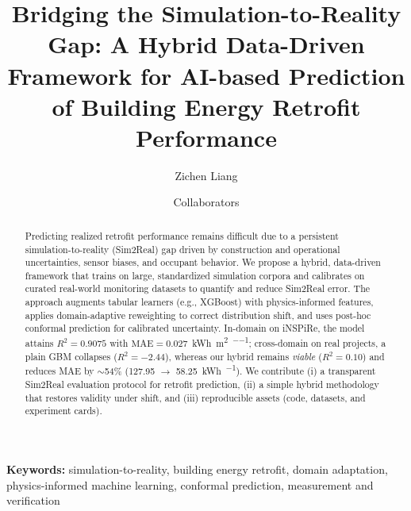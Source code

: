 ﻿\documentclass{article}
\title{Bridging the Simulation-to-Reality Gap: A Hybrid Data-Driven Framework for AI-based Prediction of Building Energy Retrofit Performance}
\author{Zichen Liang \and Collaborators}
\date{}
\begin{document}
\maketitle

\begin{abstract}
Predicting realized retrofit performance remains difficult due to a persistent simulation-to-reality (Sim2Real) gap driven by construction and operational uncertainties, sensor biases, and occupant behavior. We propose a hybrid, data-driven framework that trains on large, standardized simulation corpora and calibrates on curated real-world monitoring datasets to quantify and reduce Sim2Real error. The approach augments tabular learners (e.g., XGBoost) with physics-informed features, applies domain-adaptive reweighting to correct distribution shift, and uses post-hoc conformal prediction for calibrated uncertainty. In-domain on iNSPiRe, the model attains $R^2=0.9075$ with $\mathrm{MAE}=0.027$~\si{kWh\per\square\meter\per\year}; cross-domain on real projects, a plain GBM collapses ($R^2=-2.44$), whereas our hybrid remains \emph{viable} ($R^2=0.10$) and reduces MAE by $\sim$54\% (127.95 $\rightarrow$ 58.25~\si{kWh\per\month}). We contribute (i) a transparent Sim2Real evaluation protocol for retrofit prediction, (ii) a simple hybrid methodology that restores validity under shift, and (iii) reproducible assets (code, datasets, and experiment cards).
\end{abstract}

\noindent\textbf{Keywords:} simulation-to-reality, building energy retrofit, domain adaptation, physics-informed machine learning, conformal prediction, measurement and verification
\end{document}
